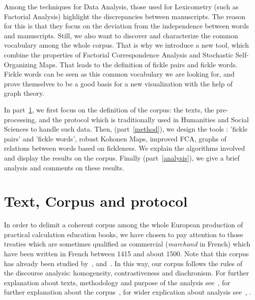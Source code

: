 \documentclass[preprint]{elsarticle}
\begin{document}
Among the techniques for Data Analysis, those used for Lexicometry (such as Factorial Analysis) highlight the discrepancies between manuscripts. The reason for this is that they focus on the deviation from the independence between words and manuscripts. Still, we also want to discover and characterize the common vocabulary among the whole corpus. That is why we introduce a new tool, which combine the properties of Factorial Correspondence Analysis and Stochastic Self-Organizing Maps. That leads to the definition of fickle pairs and fickle words. Fickle words can be seen as this common vocabulary we are looking for, and prove themselves to be a good basis for a new visualization with the help of graph theory.

In part~\ref{corpus}, we first focus on the definition of the corpus: the texts, the pre-processing, and the protocol which is traditionally used in Humanities and Social Sciences to handle such data. Then, (part~\ref{method}), we design the tools : 'fickle pairs' and 'fickle words', robust Kohonen Maps, improved FCA, graphs of relations between words based on fickleness. We explain the algorithms involved and display the results on the corpus. Finally (part~\ref{analysis}), we give a brief analysis and comments on these results.

\section{Text, Corpus and protocol}\label{corpus}

In order to delimit a coherent corpus among the whole European production of practical calculation education books, we have chosen to pay attention to those treaties which are sometimes qualified as commercial (\textit{marchand} in French) which have been written in French between 1415 and about 1500. Note that this corpus has already been studied by~\cite{beaujouanplace1988}, \cite{spiesserarithmetique2003} and~\cite{benoitrecherches1985}. In this way, our corpus follows the rules of the discourse analysis: homogeneity, contrastiveness and diachronism. For further explanation about texts, methodology and purpose of the analysis see~\cite{lamasse2012}, for further explanation about the corpus~\cite{prost1988}, for wider explication about analysis see~\cite{Mayaffre2005}, \cite{Rastier2011}.\\
\end{document}
